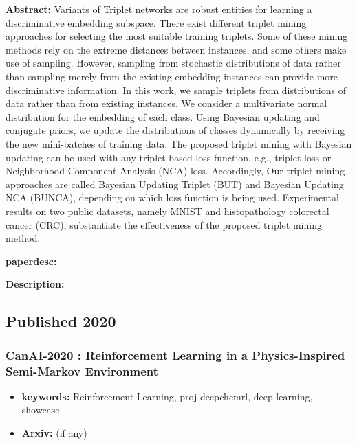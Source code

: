 \documentclass{article}
\begin{document}

\textbf{Abstract:} Variants of Triplet networks are robust entities for learning a discriminative embedding subspace. There exist different triplet mining approaches for selecting the most suitable training triplets. Some of these mining methods rely on the extreme distances between instances, and some others make use of sampling. However, sampling from stochastic distributions of data rather than sampling merely from the existing embedding instances can provide more discriminative information. In this work, we sample triplets from distributions of data rather than from existing instances. We consider a multivariate normal distribution for the embedding of each class. Using Bayesian updating and conjugate priors, we update the distributions of classes dynamically by receiving the new mini-batches of training data. The proposed triplet mining with Bayesian updating can be used with any triplet-based loss function, e.g., triplet-loss or Neighborhood Component Analysis (NCA) loss. Accordingly, Our triplet mining approaches are called Bayesian Updating Triplet (BUT) and Bayesian Updating NCA (BUNCA), depending on which loss function is being used. Experimental results on two public datasets, namely MNIST and histopathology colorectal cancer (CRC), substantiate the effectiveness of the proposed triplet mining method.

\textbf{paperdesc:} 

\textbf{Description:} 







\newpage
\subsection{Published 2020}
\subsubsection{\textbf{CanAI-2020} : Reinforcement Learning in a Physics-Inspired Semi-Markov Environment}
\begin{itemize}
\item \textbf{keywords:} Reinforcement-Learning, proj-deepchemrl, deep learning, showcase
\item \textbf{Arxiv:}  (if any)
\end{itemize}
\end{document}
